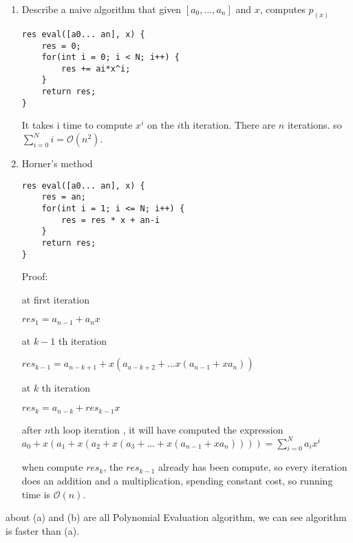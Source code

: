\documentclass[11pt]{article}
\newenvironment{qparts}{\begin{enumerate}[{(}a{)}]}{\end{enumerate}}
\begin{document}
\begin{qparts}

\item Describe a naive algorithm that given $ [a_0,...,a_n] $ and $ x $, computes $ p_(x) $

\begin{lstlisting}
res eval([a0... an], x) {
    res = 0;
    for(int i = 0; i < N; i++) {
        res += ai*x^i;
    }
    return res;
}
\end{lstlisting}

It takes i time to compute $ x^i $ on the $ i $th iteration. There are $ n $ iterations. so $ \sum_{i=0}^{N}i = \mathcal{O}(n^2) $.

\item Horner's method

\begin{lstlisting}
res eval([a0... an], x) {
    res = an;
    for(int i = 1; i <= N; i++) {
        res = res * x + an-i
    }
    return res;
}
\end{lstlisting}

Proof:

at first iteration

$ res_{1} = a_{n-1} + a_nx $

at $k-1$ th iteration

$ res_{k-1} = a_{n-k+1} + x(a_{a-k+2} + ... x(a_{n-1} + xa_n)) $

at $k$ th iteration

$ res_{k} = a_{n-k} + res_{k-1}x $

after $ n $th loop iteration , it will have computed the expression $ a_{0} + x(a_{1} + x(a_{2} + x(a_{3} +...+ x(a_{n-1} + xa_{n})))) = \sum_{i=0}^{N}a_{i}x^{i} $

when compute $ res_{k} $, the $ res_{k-1} $ already has been compute, so every iteration does an addition and a multiplication, spending constant cost, so running time is $ \mathcal{O}(n) $.

\end{qparts}

about (a) and (b) are all Polynomial Evaluation algorithm, we can see algorithm is faster than (a).
\end{document}
